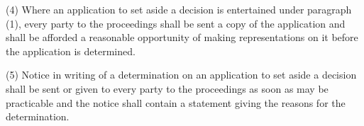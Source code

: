 \documentclass[12pt,a4paper]{article}
\begin{document}
(4) Where an application to set aside a decision is entertained under paragraph (1), every party to the proceedings shall be sent a copy of the application and shall be afforded a reasonable opportunity of making representations on it before the application is determined.

(5) Notice in writing of a determination on an application to set aside a decision shall be sent or given to every party to the proceedings as soon as may be practicable and the notice shall contain a statement giving the reasons for the determination.

%
%
%
%
%
%
\end{document}
